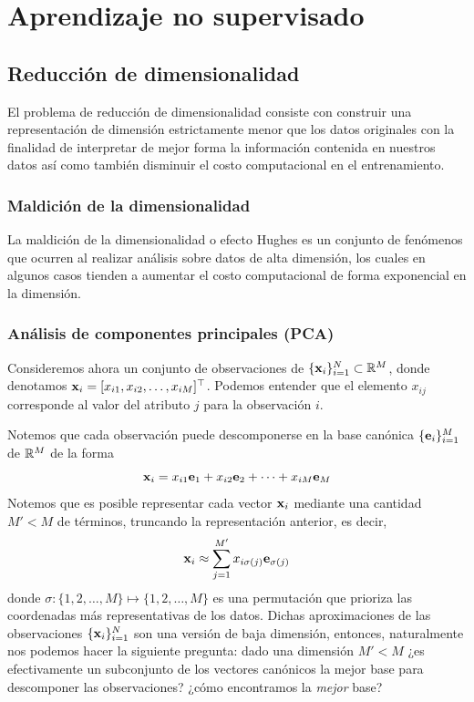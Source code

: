 
\section{Aprendizaje no supervisado}

\subsection{Reducción de dimensionalidad}

El problema de reducción de dimensionalidad consiste con construir una representación de dimensión estrictamente menor que los datos originales con la finalidad de interpretar de mejor forma la información contenida en nuestros datos así como también disminuir el costo computacional en el entrenamiento.

\subsubsection{Maldición de la dimensionalidad}

La maldición de la dimensionalidad o efecto Hughes es un conjunto de fenómenos que ocurren al realizar análisis sobre datos de alta dimensión, los cuales en algunos casos tienden a aumentar el costo computacional de forma exponencial en la dimensión.

\subsubsection{Análisis de componentes principales (PCA)}

Consideremos ahora un conjunto de observaciones de $\{\mathbf{x}_i\}_{i=1}^N\subset\mathbb{R}^M$, donde denotamos $\mathbf{x}_i=[x_{i1},x_{i2},\ldots,x_{iM}]^\top$. Podemos entender que el elemento $x_{ij}$ corresponde al valor del atributo $j$ para la observación $i$. 

Notemos que cada observación puede descomponerse en la base canónica $\{\mathbf{e}_i\}_{i=1}^M$ de $\mathbb{R}^M$ de la forma 
\begin{equation}
	\mathbf{x}_i = x_{i1}\mathbf{e}_1 +  x_{i2}\mathbf{e}_2 + \cdots + x_{iM}\mathbf{e}_M 		
\end{equation}
Notemos que es posible representar cada vector $\mathbf{x}_i$ mediante una cantidad $M'<M$ de términos, truncando la representación anterior, es decir,  
\begin{equation}
	\mathbf{x}_i \approx \sum_{j=1}^{M'} x_{i\sigma(j)}\mathbf{e}_{\sigma(j)}
\end{equation}
donde $\sigma:\{1,2,\ldots,M\}\mapsto\{1,2,\ldots,M\}$ es una permutación que prioriza las coordenadas más representativas de los datos. Dichas aproximaciones de las observaciones $\{\mathbf{x}_i\}_{i=1}^N$ son una versión de baja dimensión, entonces, naturalmente nos podemos hacer la siguiente pregunta: dado una dimensión $M'<M$  ¿es efectivamente un subconjunto de los vectores canónicos la mejor base para descomponer las observaciones?  ¿cómo encontramos la \emph{mejor} base?


